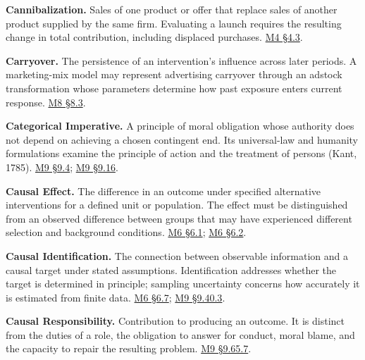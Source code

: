 \noindent\textbf{Cannibalization.} Sales of one product or offer that replace
sales of another product supplied by the same firm. Evaluating a launch
requires the resulting change in total contribution, including displaced
purchases.
\href{Marketing_Analytics_Lecture_Notes.pdf\#M04-case-study-a-new-bundle-can-cannibalize-existing-sales}{M4
§4.3}.

\noindent\textbf{Carryover.} The persistence of an intervention's influence
across later periods. A marketing-mix model may represent advertising
carryover through an adstock transformation whose parameters determine
how past exposure enters current response.
\href{Marketing_Analytics_Lecture_Notes.pdf\#M08-marketing-mix-models-combine-carryover-and-saturation}{M8
§8.3}.

\noindent\textbf{Categorical Imperative.} A principle of moral obligation whose
authority does not depend on achieving a chosen contingent end. Its
universal-law and humanity formulations examine the principle of action
and the treatment of persons (Kant, 1785).
\hyperref[M09-respect-for-persons-and-commercial-exchange]{M9
§9.4};
\hyperref[M09-a-kantian-critique-of-commercial-optimization]{M9
§9.16}.

\noindent\textbf{Causal Effect.} The difference in an outcome under specified
alternative interventions for a defined unit or population. The effect
must be distinguished from an observed difference between groups that
may have experienced different selection and background conditions.
\href{Marketing_Analytics_Lecture_Notes.pdf\#M06-define-the-treatment-outcome-and-estimand}{M6
§6.1};
\href{Marketing_Analytics_Lecture_Notes.pdf\#M06-why-the-treated-untreated-difference-can-be-biased}{M6
§6.2}.

\noindent\textbf{Causal Identification.} The connection between observable
information and a causal target under stated assumptions. Identification
addresses whether the target is determined in principle; sampling
uncertainty concerns how accurately it is estimated from finite data.
\href{Marketing_Analytics_Lecture_Notes.pdf\#M06-observational-adjustment-and-its-limits}{M6
§6.7};
\hyperref[M09-compatibility-identification-and-valuation]{M9
§9.40.3}.

\noindent\textbf{Causal Responsibility.} Contribution to producing an outcome. It
is distinct from the duties of a role, the obligation to answer for
conduct, moral blame, and the capacity to repair the resulting problem.
\hyperref[M09-responsibility-for-the-artifact-and-its-uses]{M9
§9.65.7}.

